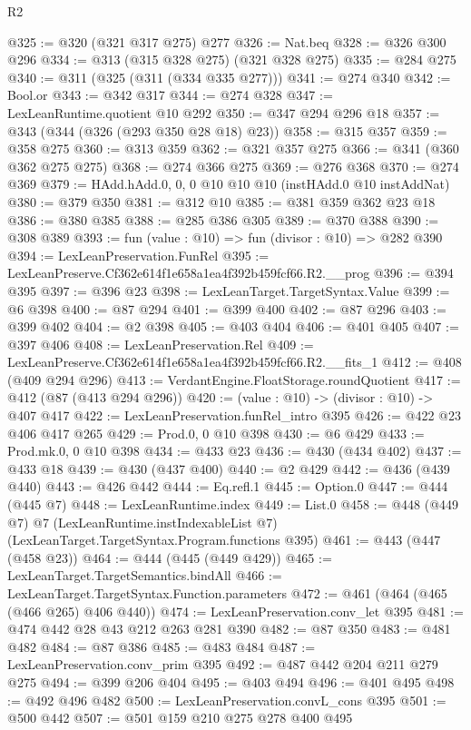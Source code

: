 \begin{lexlean}{R2}
\begin{coremodule}
@325 := @320 (@321 @317 @275) @277
@326 := Nat.beq
@328 := @326 @300 @296
@334 := @313 (@315 @328 @275) (@321 @328 @275)
@335 := @284 @275
@340 := @311 (@325 (@311 (@334 @335 @277)))
@341 := @274 @340
@342 := Bool.or
@343 := @342 @317
@344 := @274 @328
@347 := LexLeanRuntime.quotient @10 @292
@350 := @347 @294 @296 @18
@357 := @343 (@344 (@326 (@293 @350 @28 @18) @23))
@358 := @315 @357
@359 := @358 @275
@360 := @313 @359
@362 := @321 @357 @275
@366 := @341 (@360 @362 @275 @275)
@368 := @274 @366 @275
@369 := @276 @368
@370 := @274 @369
@379 := HAdd.hAdd.{0, 0, 0} @10 @10 @10 (instHAdd.{0} @10 instAddNat)
@380 := @379 @350
@381 := @312 @10
@385 := @381 @359 @362 @23 @18
@386 := @380 @385
@388 := @285 @386 @305
@389 := @370 @388
@390 := @308 @389
@393 := fun (value : @10) => fun (divisor : @10) => @282 @390
@394 := LexLeanPreservation.FunRel
@395 := LexLeanPreserve.Cf362e614f1e658a1ea4f392b459fcf66.R2.__prog
@396 := @394 @395
@397 := @396 @23
@398 := LexLeanTarget.TargetSyntax.Value
@399 := @6 @398
@400 := @87 @294
@401 := @399 @400
@402 := @87 @296
@403 := @399 @402
@404 := @2 @398
@405 := @403 @404
@406 := @401 @405
@407 := @397 @406
@408 := LexLeanPreservation.Rel
@409 := LexLeanPreserve.Cf362e614f1e658a1ea4f392b459fcf66.R2.__fits_1
@412 := @408 (@409 @294 @296)
@413 := VerdantEngine.FloatStorage.roundQuotient
@417 := @412 (@87 (@413 @294 @296))
@420 := (value : @10) -> (divisor : @10) -> @407 @417
@422 := LexLeanPreservation.funRel_intro @395
@426 := @422 @23 @406 @417 @265
@429 := Prod.{0, 0} @10 @398
@430 := @6 @429
@433 := Prod.mk.{0, 0} @10 @398
@434 := @433 @23
@436 := @430 (@434 @402)
@437 := @433 @18
@439 := @430 (@437 @400)
@440 := @2 @429
@442 := @436 (@439 @440)
@443 := @426 @442
@444 := Eq.refl.{1}
@445 := Option.{0}
@447 := @444 (@445 @7)
@448 := LexLeanRuntime.index
@449 := List.{0}
@458 := @448
    (@449 @7)
    @7
    (LexLeanRuntime.instIndexableList @7)
    (LexLeanTarget.TargetSyntax.Program.functions @395)
@461 := @443 (@447 (@458 @23))
@464 := @444 (@445 (@449 @429))
@465 := LexLeanTarget.TargetSemantics.bindAll
@466 := LexLeanTarget.TargetSyntax.Function.parameters
@472 := @461 (@464 (@465 (@466 @265) @406 @440))
@474 := LexLeanPreservation.conv_let @395
@481 := @474 @442 @28 @43 @212 @263 @281 @390
@482 := @87 @350
@483 := @481 @482
@484 := @87 @386
@485 := @483 @484
@487 := LexLeanPreservation.conv_prim @395
@492 := @487 @442 @204 @211 @279 @275
@494 := @399 @206 @404
@495 := @403 @494
@496 := @401 @495
@498 := @492 @496 @482
@500 := LexLeanPreservation.convL_cons @395
@501 := @500 @442
@507 := @501 @159 @210 @275 @278 @400 @495

\end{coremodule}
\end{lexlean}
